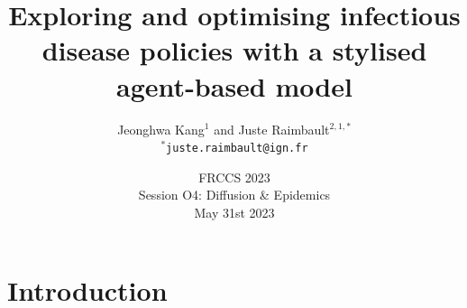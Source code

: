 






\title[Exploring and optimising infectious disease policies]{Exploring and optimising infectious disease policies with a stylised agent-based model}

\author[Kang and Raimbault]{Jeonghwa Kang$^1$ and Juste Raimbault$^{2,1,\ast}$\\\medskip
$^{\ast}$\texttt{juste.raimbault@ign.fr}
}



\date[31/05/2023]{FRCCS 2023\\
Session O4: Diffusion \& Epidemics\\
May 31st 2023
}

\frame{\maketitle}



\section{Introduction}


